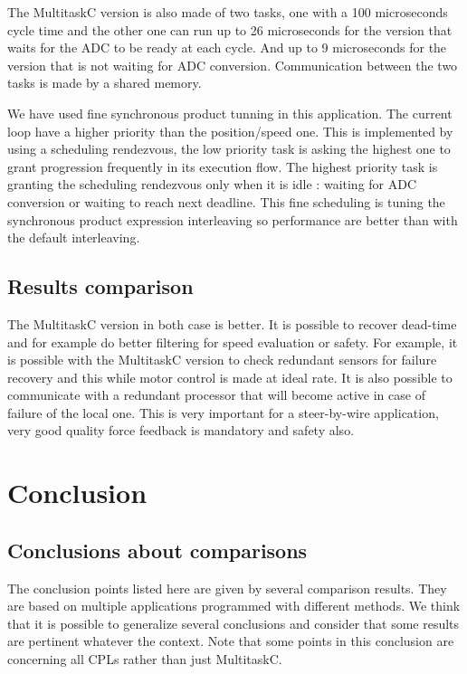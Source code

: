\documentclass[10pt]{report}
\begin{document}
The MultitaskC version is also made of two tasks, one with a 100 microseconds cycle time and the other one
can run up to 26 microseconds for the version that waits for the ADC to be ready at each cycle. And up
to 9 microseconds for the version that is not waiting for ADC conversion. Communication between the two
tasks is made by a shared memory.

We have used fine synchronous product tunning in this application. The current loop have a higher priority
than the position/speed one. This is implemented by using a scheduling rendezvous, the low priority task
is asking the highest one to grant progression frequently in its execution flow. The highest priority
task is granting the scheduling rendezvous only when it is idle : waiting for ADC conversion or waiting
to reach next deadline. This fine scheduling is tuning the synchronous product expression interleaving
so performance are better than with the default interleaving.

\section{Results comparison}

The MultitaskC version in both case is better. It is possible to recover dead-time and for example do better
filtering for speed evaluation or safety. For example, it is possible with the MultitaskC version to
check redundant sensors for failure recovery and this while motor control is made at ideal rate. It is
also possible to communicate with a redundant processor that will become active in case of failure
of the local one. This is very important for a steer-by-wire application, very good quality force feedback
is mandatory and safety also.

\chapter{Conclusion}
\label{sec:conclusion}

\section{Conclusions about comparisons}

The conclusion points listed here are given by several comparison results. They are based on multiple applications
programmed with different methods. We think that it is possible to generalize several conclusions and consider that
some results are pertinent whatever the context. Note that some points in this conclusion are concerning all
CPLs rather than just MultitaskC.
\end{document}
